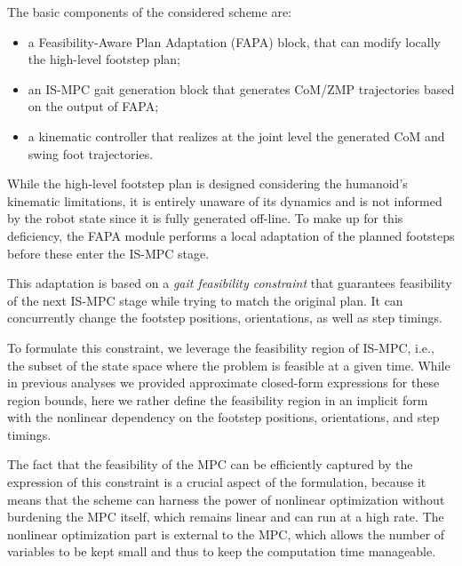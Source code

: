 The basic components of the considered scheme are:
\begin{itemize}
\item a Feasibility-Aware Plan Adaptation (FAPA) block, that can modify locally the high-level footstep plan;
\item an IS-MPC gait generation block that generates CoM/ZMP trajectories based on the output of FAPA;
\item a kinematic controller that realizes at the joint level the generated CoM and swing foot trajectories.
\end{itemize}

While the high-level footstep plan is designed considering the humanoid's kinematic limitations, it is entirely unaware of its dynamics and is not informed by the robot state since it is fully generated off-line.
To make up for this deficiency, the FAPA module performs a local adaptation of the planned footsteps before these enter the IS-MPC stage. 

This adaptation is based on a {\em gait feasibility constraint} that guarantees feasibility of the next IS-MPC stage while trying to match the original plan. It can concurrently change the footstep positions, orientations, as well as step timings. 

To formulate this constraint, we leverage the feasibility region of IS-MPC, i.e., the subset of the state space where the problem is feasible at a given time. While in previous analyses we provided approximate closed-form expressions for these region bounds, here we rather define the feasibility region in an implicit form with the nonlinear dependency on the footstep positions, orientations, and step timings.

The fact that the feasibility of the MPC can be efficiently captured by the expression of this constraint is a crucial aspect of the formulation, because it means that the scheme can harness the power of nonlinear optimization without burdening the MPC itself, which remains linear and can run at a high rate. The nonlinear optimization part is external to the MPC, which allows the number of variables to be kept small and thus to keep the computation time manageable.

